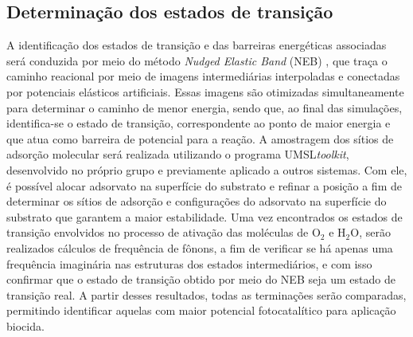 \subsection{Determinação dos estados de transição}
A identificação dos estados de transição e das barreiras energéticas associadas será conduzida por meio do método \textit{Nudged Elastic Band} (NEB) \cite{jonsson1998nudged}, que traça o caminho reacional por meio de imagens intermediárias interpoladas e conectadas por potenciais elásticos artificiais. Essas imagens são otimizadas simultaneamente para determinar o caminho de menor energia, sendo que, ao final das simulações, identifica-se o estado de transição, correspondente ao ponto de maior energia e que atua como barreira de potencial para a reação. A amostragem dos sítios de adsorção molecular será realizada utilizando o programa UMSL\textit{toolkit}, desenvolvido no próprio grupo e previamente aplicado a outros sistemas. Com ele, é possível alocar adsorvato na superfície do substrato e refinar a posição a fim de determinar os sítios de adsorção e configurações do adsorvato na superfície do substrato que garantem a maior estabilidade. Uma vez encontrados os estados de transição envolvidos no processo de ativação das moléculas de O$_2$ e H$_2$O, serão realizados cálculos de frequência de fônons, a fim de verificar se há apenas uma frequência imaginária nas estruturas dos estados intermediários, e com isso confirmar que o estado de transição obtido por meio do NEB seja um estado de transição real. A partir desses resultados, todas as terminações serão comparadas, permitindo identificar aquelas com maior potencial fotocatalítico para aplicação biocida.